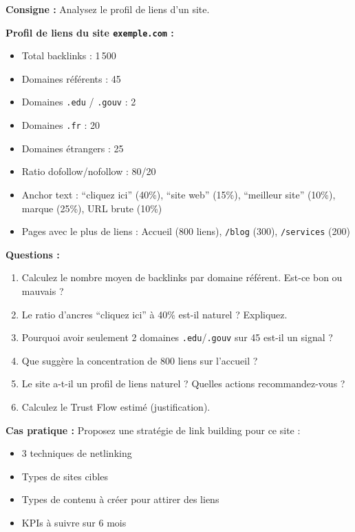 \documentclass[12pt,a4paper]{report}
\begin{document}
\textbf{Consigne :} Analysez le profil de liens d'un site.

\textbf{Profil de liens du site \texttt{exemple.com} :}
\begin{itemize}
    \item Total backlinks : 1\,500
    \item Domaines r\'{e}f\'{e}rents : 45
    \item Domaines \texttt{.edu} / \texttt{.gouv} : 2
    \item Domaines \texttt{.fr} : 20
    \item Domaines \'{e}trangers : 25
    \item Ratio dofollow/nofollow : 80/20
    \item Anchor text : ``cliquez ici'' (40\%), ``site web'' (15\%), ``meilleur site'' (10\%), marque (25\%), URL brute (10\%)
    \item Pages avec le plus de liens : Accueil (800 liens), \texttt{/blog} (300), \texttt{/services} (200)
\end{itemize}

\textbf{Questions :}
\begin{enumerate}
    \item Calculez le nombre moyen de backlinks par domaine r\'{e}f\'{e}rent. Est-ce bon ou mauvais ?
    \item Le ratio d'ancres ``cliquez ici'' \`{a} 40\% est-il naturel ? Expliquez.
    \item Pourquoi avoir seulement 2 domaines \texttt{.edu}/\texttt{.gouv} sur 45 est-il un signal ?
    \item Que sugg\`{e}re la concentration de 800 liens sur l'accueil ?
    \item Le site a-t-il un profil de liens naturel ? Quelles actions recommandez-vous ?
    \item Calculez le Trust Flow estim\'{e} (justification).
\end{enumerate}

\textbf{Cas pratique :} Proposez une strat\'{e}gie de link building pour ce site :
\begin{itemize}
    \item 3 techniques de netlinking
    \item Types de sites cibles
    \item Types de contenu \`{a} cr\'{e}er pour attirer des liens
    \item KPIs \`{a} suivre sur 6 mois
\end{itemize}
\end{document}

